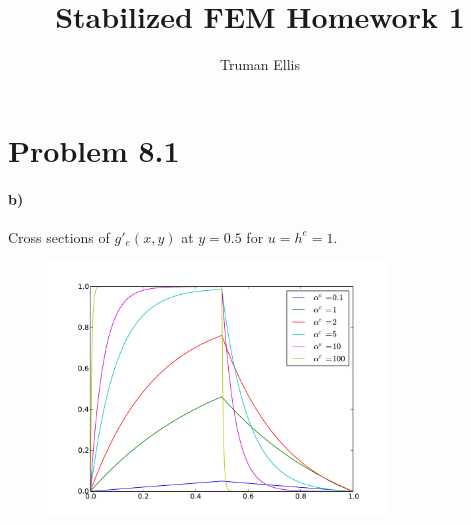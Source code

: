 \documentclass[12pt]{article}
\title{Stabilized FEM Homework 1}
\author{Truman Ellis}
\date{}
\begin{document}
\section*{Problem 8.1}
\paragraph{b)}
Cross sections of $g'_e(x,y)$ at $y=0.5$ for $u=h^e=1$.
\begin{figure}[h!]
\centering
\includegraphics[width=0.8\textwidth]{lines.pdf}
\end{figure}


\clearpage
\newpage
\end{document}
